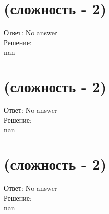 \documentclass{article}%
\begin{document}
%
\section{(сложность {-} 2)}%
\label{sec:( {-} 2)}%
\hspace{3ex} Ответ: No answer \\%
%
\hspace*{3ex} Решение: \\%
nan

%
\section{(сложность {-} 2)}%
\label{sec:( {-} 2)}%
\hspace{3ex} Ответ: No answer \\%
%
\hspace*{3ex} Решение: \\%
nan

%
\section{(сложность {-} 2)}%
\label{sec:( {-} 2)}%
\hspace{3ex} Ответ: No answer \\%
%
\hspace*{3ex} Решение: \\%
nan

%
\end{document}
